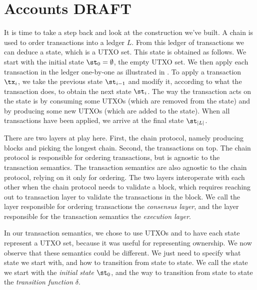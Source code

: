 \chapter{Accounts \small{\textsf{DRAFT}}}\label{chapter.accounts}

It is time to take a step back and look at the construction we've built. A chain
is used to order transactions into a ledger $L$. From this ledger of transactions we can deduce
a state, which is a UTXO set. This state is obtained as follows. We start with the initial
state $\st_0 = \emptyset$, the empty UTXO set. We then apply each transaction in the ledger
one-by-one as illustrated in .
To apply a transaction $\tx_i$, we take the previous state $\st_{i-1}$ and modify
it, according to what the transaction does, to obtain the next state $\st_i$. The way the
transaction acts on the state is by consuming some UTXOs (which are removed from the state)
and by producing some new UTXOs (which are added to the state). When all transactions have been
applied, we arrive at the final state $\st_{|L|}$.

There are two layers at play here. First, the chain protocol, namely producing blocks and
picking the longest chain. Second, the transactions on top. The chain protocol is responsible
for ordering transactions, but is agnostic to the transaction semantics. The transaction semantics
are also agnostic to the chain protocol, relying on it only for ordering. The two layers interoperate
with each other when the chain protocol needs to validate a block, which requires reaching out to
transaction layer to validate the transactions in the block.
We call the layer responsible for ordering transactions the \emph{consensus layer},
and the layer responsible for the transaction semantics the \emph{execution layer}.

In our transaction semantics, we chose to use UTXOs and to have each state represent a UTXO set,
because it was useful for representing ownership. We now observe that these semantics could be
different. We just need to specify what state we start with, and how to transition from state to state.
We call the state we start with the \emph{initial state} $\st_0$, and the way to transition from state
to state the \emph{transition function} $\delta$.


